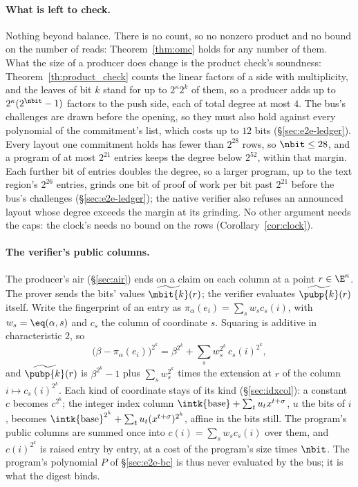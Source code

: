 \paragraph{What is left to check.} Nothing beyond balance. There is no count, so no nonzero product and no bound on the number of reads: Theorem~\ref{thm:omc} holds for any number of them. What the size of a producer does change is the product check's soundness: Theorem~\ref{th:product_check} counts the linear factors of a side with multiplicity, and the leaves of bit $k$ stand for up to $2^{\kappa}2^{k}$ of them, so a producer adds up to $2^{\kappa}(2^{\nbit}-1)$ factors to the push side, each of total degree at most $4$. The bus's challenges are drawn before the opening, so they must also hold against every polynomial of the commitment's list, which costs up to $12$ bits (\S\ref{sec:e2e-ledger}). Every layout one commitment holds has fewer than $2^{28}$ rows, so $\nbit\le28$, and a program of at most $2^{21}$ entries keeps the degree below $2^{52}$, within that margin. Each further bit of entries doubles the degree, so a larger program, up to the text region's $2^{26}$ entries, grinds one bit of proof of work per bit past $2^{21}$ before the bus's challenges (\S\ref{sec:e2e-ledger}); the native verifier also refuses an announced layout whose degree exceeds the margin at its grinding. No other argument needs the caps: the clock's needs no bound on the rows (Corollary~\ref{cor:clock}).

\paragraph{The verifier's public columns.} The producer's air (\S\ref{sec:air}) ends on a claim on each column at a point $r\in\E^{\kappa}$. The prover sends the bits' values $\widetilde{\mbit{k}}(r)$; the verifier evaluates $\widetilde{\pubp{k}}(r)$ itself. Write the fingerprint of an entry as $\pi_\alpha(e_i)=\sum_sw_sc_s(i)$, with $w_s=\eq(\alpha,s)$ and $c_s$ the column of coordinate $s$. Squaring is additive in characteristic $2$, so
\[
  \bigl(\beta-\pi_\alpha(e_i)\bigr)^{2^{k}}=\beta^{2^{k}}+\sum_sw_s^{2^{k}}\,c_s(i)^{2^{k}},
\]
and $\widetilde{\pubp{k}}(r)$ is $\beta^{2^{k}}-1$ plus $\sum_sw_s^{2^{k}}$ times the extension at $r$ of the column $i\mapsto c_s(i)^{2^{k}}$. Each kind of coordinate stays of its kind (\S\ref{sec:idxcol}): a constant $c$ becomes $c^{2^{k}}$; the integer index column $\intk{\mathrm{base}}+\sum_tu_tx^{t+\sigma}$, $u$ the bits of $i$, becomes $\intk{\mathrm{base}}^{2^{k}}+\sum_tu_t(x^{t+\sigma})^{2^{k}}$, affine in the bits still. The program's public columns are summed once into $c(i)=\sum_sw_sc_s(i)$ over them, and $c(i)^{2^{k}}$ is raised entry by entry, at a cost of the program's size times $\nbit$. The program's polynomial $P$ of \S\ref{sec:e2e-bc} is thus never evaluated by the bus; it is what the digest binds.

